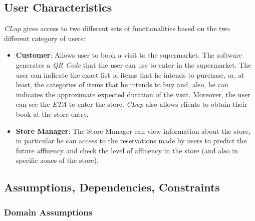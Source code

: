 \documentclass{article}
\begin{document}
	\bigskip
	\subsection{User Characteristics}
	
	\emph{CLup} gives access to two different sets of functionalities based on the two different category of users:
	
	\bigskip
	\begin{itemize}
		
		\item {\bfseries Customer}: Allows user to book a visit to the supermarket. The software generates a \emph{QR Code} that the user can use to enter in the supermarket. The user can indicate the exact list of items that he intends to purchase, or, at least, the categories of items that he intends to buy and, also, he can indicates the approximate expected duration of the visit. Moreover, the user can see the \emph{ETA} to enter the store. \emph{CLup} also allows clients to obtain their book at the store entry.\\
		
		\item {\bfseries Store Manager}: The Store Manager can view information about the store, in particular he can access to the reservations made by users to predict the future affluency and check the level of affluency in the store (and also in specific zones of the store). \\
		
	\end{itemize}

	\subsection{Assumptions, Dependencies, Constraints}
	
	\smallskip
	
		\subsubsection{Domain Assumptions}
		
			\bigskip
			
\end{document}
